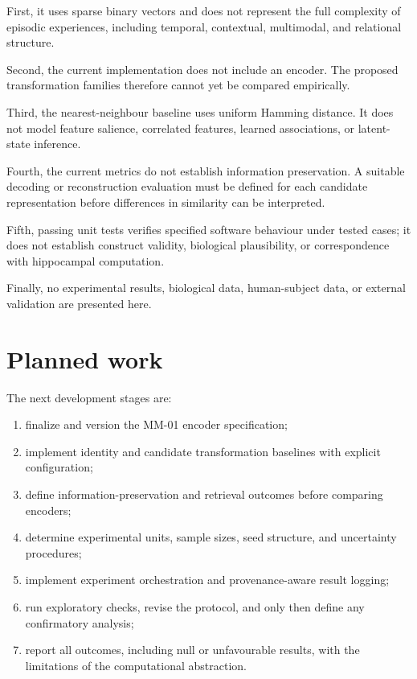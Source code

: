 \documentclass[11pt,a4paper]{article}
\begin{document}
First, it uses sparse binary vectors and does not represent the full complexity of episodic experiences, including temporal, contextual, multimodal, and relational structure.

Second, the current implementation does not include an encoder. The proposed transformation families therefore cannot yet be compared empirically.

Third, the nearest-neighbour baseline uses uniform Hamming distance. It does not model feature salience, correlated features, learned associations, or latent-state inference.

Fourth, the current metrics do not establish information preservation. A suitable decoding or reconstruction evaluation must be defined for each candidate representation before differences in similarity can be interpreted.

Fifth, passing unit tests verifies specified software behaviour under tested cases; it does not establish construct validity, biological plausibility, or correspondence with hippocampal computation.

Finally, no experimental results, biological data, human-subject data, or external validation are presented here.

\section{Planned work}

The next development stages are:
\begin{enumerate}
    \item finalize and version the MM-01 encoder specification;
    \item implement identity and candidate transformation baselines with explicit configuration;
    \item define information-preservation and retrieval outcomes before comparing encoders;
    \item determine experimental units, sample sizes, seed structure, and uncertainty procedures;
    \item implement experiment orchestration and provenance-aware result logging;
    \item run exploratory checks, revise the protocol, and only then define any confirmatory analysis;
    \item report all outcomes, including null or unfavourable results, with the limitations of the computational abstraction.
\end{enumerate}
\end{document}
